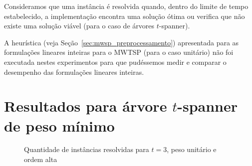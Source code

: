 Consideramos que uma instância é resolvida quando, dentro do limite de
tempo estabelecido, a implementação encontra uma solução ótima ou verifica
que não existe uma solução viável (para o caso de árvores
$t$-spanner).

A heurística (veja Seção~\ref{sec:mwsp_preprocessamento}) apresentada 
para as formulações lineares inteiras para o MWTSP (para o caso unitário)
não foi executada nestes experimentos para que pudéssemos medir e
comparar o desempenho das formulações lineares inteiras.

\section{Resultados para árvore $t$-spanner de peso mínimo}
\begin{figure}[t]%
    \centering
    \caption{Quantidade de instâncias resolvidas para $t = 3$, peso unitário e ordem alta}%
    \label{fig:tree_sf3_s40_50_unit}%
\end{figure}

